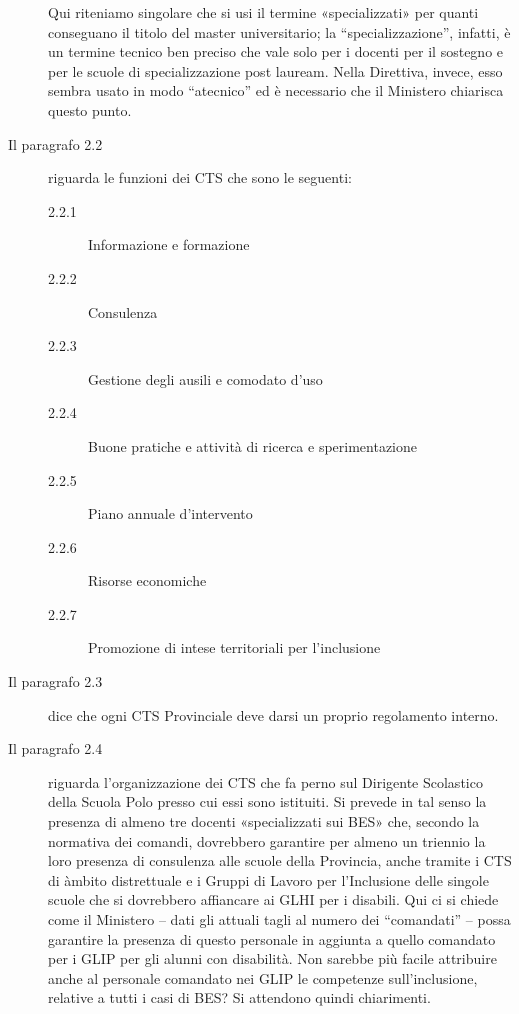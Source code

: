 \begin{description}
	Qui riteniamo singolare che si usi il termine «specializzati» per quanti conseguano il titolo del master universitario; la “specializzazione”, infatti, è un termine tecnico ben preciso che vale solo per i docenti per il sostegno e per le scuole di specializzazione post lauream. Nella Direttiva, invece, esso sembra usato in modo “atecnico” ed è necessario che il Ministero chiarisca questo punto.
	\item [Il paragrafo 2.2]riguarda le funzioni dei CTS che sono le seguenti:
	\begin{description}
		\item[2.2.1] Informazione e formazione
		\item[2.2.2]Consulenza
		\item[2.2.3]Gestione degli ausili e comodato d’uso
		\item[2.2.4]Buone pratiche e attività di ricerca e sperimentazione
		\item[2.2.5]Piano annuale d’intervento
		\item[2.2.6]Risorse economiche
		\item[2.2.7]Promozione di intese territoriali per l’inclusione
	\end{description}
\item [Il paragrafo 2.3] dice che ogni CTS Provinciale deve darsi un proprio regolamento interno.
\item [Il paragrafo 2.4] riguarda l'organizzazione dei CTS che fa perno sul Dirigente Scolastico della Scuola Polo presso cui essi sono istituiti. Si prevede in tal senso la presenza di almeno tre docenti «specializzati sui BES» che, secondo la normativa dei comandi, dovrebbero garantire per almeno un triennio la loro presenza di consulenza alle scuole della Provincia, anche tramite i CTS di àmbito distrettuale e i Gruppi di Lavoro per l'Inclusione delle singole scuole che si dovrebbero affiancare ai GLHI per i disabili.
Qui ci si chiede come il Ministero – dati gli attuali tagli al numero dei “comandati” – possa garantire la presenza di questo personale in aggiunta a quello comandato per i GLIP per gli alunni con disabilità. Non sarebbe più facile attribuire anche al personale comandato nei GLIP le competenze sull'inclusione, relative a tutti i casi di BES? Si attendono quindi chiarimenti.


\end{description}

